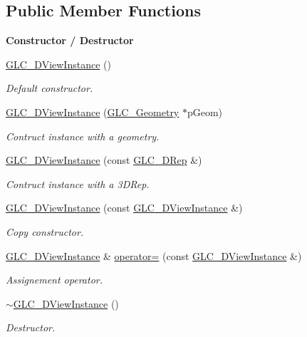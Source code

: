 \subsection*{Public Member Functions}
\begin{Indent}{\bf Constructor / Destructor}\par
\begin{DoxyCompactItemize}
\item 
\hyperlink{class_g_l_c__3_d_view_instance_af5dbdaf327e75f122add7c5bc0fca441}{G\-L\-C\-\_\-D\-View\-Instance} ()
\begin{DoxyCompactList}\small\item\em Default constructor. \end{DoxyCompactList}\item 
\hyperlink{class_g_l_c__3_d_view_instance_a3787d1520be27cb47ddec336207c1b24}{G\-L\-C\-\_\-D\-View\-Instance} (\hyperlink{class_g_l_c___geometry}{G\-L\-C\-\_\-\-Geometry} $\ast$p\-Geom)
\begin{DoxyCompactList}\small\item\em Contruct instance with a geometry. \end{DoxyCompactList}\item 
\hyperlink{class_g_l_c__3_d_view_instance_ac26ed98cf65f990ef5328f97c0dd1fde}{G\-L\-C\-\_\-D\-View\-Instance} (const \hyperlink{class_g_l_c__3_d_rep}{G\-L\-C\-\_\-D\-Rep} \&)
\begin{DoxyCompactList}\small\item\em Contruct instance with a 3\-D\-Rep. \end{DoxyCompactList}\item 
\hyperlink{class_g_l_c__3_d_view_instance_a43f720cc7b4eebb7846f8128240a6ac6}{G\-L\-C\-\_\-D\-View\-Instance} (const \hyperlink{class_g_l_c__3_d_view_instance}{G\-L\-C\-\_\-D\-View\-Instance} \&)
\begin{DoxyCompactList}\small\item\em Copy constructor. \end{DoxyCompactList}\item 
\hyperlink{class_g_l_c__3_d_view_instance}{G\-L\-C\-\_\-D\-View\-Instance} \& \hyperlink{class_g_l_c__3_d_view_instance_aba8e97da420b82586a90a731d728ab56}{operator=} (const \hyperlink{class_g_l_c__3_d_view_instance}{G\-L\-C\-\_\-D\-View\-Instance} \&)
\begin{DoxyCompactList}\small\item\em Assignement operator. \end{DoxyCompactList}\item 
\hyperlink{class_g_l_c__3_d_view_instance_a6a7e9ba1b33b9e949d86e6c2e24d6b47}{$\sim$\-G\-L\-C\-\_\-D\-View\-Instance} ()
\begin{DoxyCompactList}\small\item\em Destructor. \end{DoxyCompactList}\end{DoxyCompactItemize}
\end{Indent}
